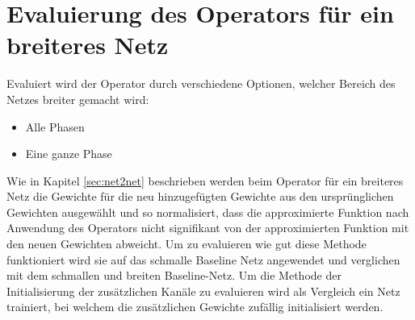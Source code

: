 \section{Evaluierung des Operators für ein breiteres Netz}
Evaluiert wird der Operator durch verschiedene Optionen, welcher Bereich des Netzes breiter gemacht wird:
\begin{itemize}
 \item Alle Phasen
 \item Eine ganze Phase
\end{itemize}
Wie in Kapitel \ref{sec:net2net} beschrieben werden beim Operator für ein breiteres Netz die Gewichte für die neu hinzugefügten Gewichte aus den ursprünglichen Gewichten ausgewählt und so normalisiert, dass die approximierte Funktion nach Anwendung des Operators nicht signifikant von der approximierten Funktion mit den neuen Gewichten abweicht. Um zu evaluieren wie gut diese Methode funktioniert wird sie auf das schmalle Baseline Netz angewendet und verglichen mit dem schmallen und breiten Baseline-Netz. Um die Methode der Initialisierung der zusätzlichen Kanäle zu evaluieren wird als Vergleich ein Netz trainiert, bei welchem die zusätzlichen Gewichte zufällig initialisiert werden.
\begin{figure}
     \centering
     \hfill
     
     \caption{}
     \label{abb:memory}
\end{figure}

